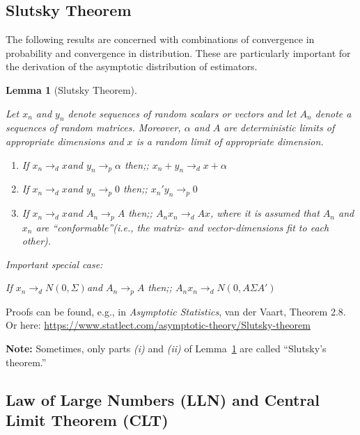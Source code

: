 \documentclass[
  letterpaper,
  DIV=11,
  numbers=noendperiod]{scrreprt}
\providecommand{\tightlist}{%
  \setlength{\itemsep}{0pt}\setlength{\parskip}{0pt}}\usepackage{longtable,booktabs,array}
\theoremstyle{definition}
\theoremstyle{plain}
\theoremstyle{plain}
\newtheorem{lemma}{Lemma}[chapter]
\theoremstyle{remark}
\begin{document}
\hypertarget{slutsky-theorem}{%
\subsection{Slutsky Theorem}\label{slutsky-theorem}}

The following results are concerned with combinations of convergence in
probability and convergence in distribution. These are particularly
important for the derivation of the asymptotic distribution of
estimators.

\leavevmode{}%
\begin{lemma}[Slutsky Theorem]\label{lem-Slutsky}

Let \(x_n\) and \(y_n\) denote sequences of random scalars or vectors
and let \(A_n\) denote a sequences of random matrices. Moreover,
\(\alpha\) and \(A\) are deterministic limits of appropriate dimensions
and \(x\) is a random limit of appropriate dimension.

\begin{enumerate}
\def\labelenumi{(\roman{enumi})}
\tightlist
\item
  If \(x_n\to_{d} x\)\quad and \quad \(y_n\to_{p} \alpha\) \quad then;;
  \(x_n+y_n\to_{d} x+\alpha\)
\item
  If \(x_n\to_{d} x\)\quad and \quad \(y_n\to_{p} 0\) \quad then;;
  \(x_n'y_n\to_{p} 0\)
\item
  If \(x_n\to_{d} x\)\quad and \quad \(A_n\to_{p} A\) \quad then;;
  \(A_nx_n\to_{d} Ax\), where it is assumed that \(A_n\) and \(x_n\) are
  ``conformable''(i.e., the matrix- and vector-dimensions fit to each
  other).
\end{enumerate}

Important special case:

If \(x_n\to_{d} N(0,\Sigma)\)\quad and \quad \(A_n\to_{p} A\)
\quad then;; \(A_nx_n\to_{d} N(0,A\Sigma A')\)

\end{lemma}

Proofs can be found, e.g., in \emph{Asymptotic Statistics}, van der
Vaart, Theorem 2.8. Or here:
\url{https://www.statlect.com/asymptotic-theory/Slutsky-theorem}

\textbf{Note:} Sometimes, only parts \emph{(i)} and \emph{(ii)} of
Lemma~\ref{lem-Slutsky} are called ``Slutsky's theorem.''

\hypertarget{law-of-large-numbers-lln-and-central-limit-theorem-clt}{%
\subsection{Law of Large Numbers (LLN) and Central Limit Theorem
(CLT)}\label{law-of-large-numbers-lln-and-central-limit-theorem-clt}}
\end{document}
